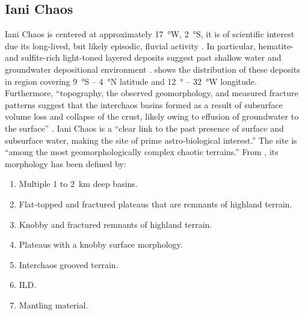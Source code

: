 \subsection{Iani Chaos}
\label{sec:MissionSites:IaniChaos}
Iani Chaos is centered at approximately \SI{17}{\degree}W, \SI{2}{\degree}S, it is of scientific interest due its long-lived, but likely episodic, fluvial activity . In particular, hematite- and sulfite-rich light-toned layered deposits suggest past shallow water and groundwater depositional environment .  shows the distribution of these deposits in region covering \SI{9}{\degree}S – \SI{4}{\degree}N latitude and \SI{12}{\degree} – \SI{32}{\degree}W longitude. Furthermore, ``topography, the observed geomorphology, and measured fracture patterns suggest that the interchaos basins formed as a result of subsurface volume loss and collapse of the crust, likely owing to effusion of groundwater to the surface'' . Iani Chaos is a ``clear link to the past presence of surface and subsurface water, making the site of prime astro-biological interest.''  The site is ``among the most geomorphologically complex chaotic terrains.'' From  , its morphology has been defined by:

\begin{enumerate}[label=\textcolor{BulletBlue}{(\alph*)}]
    \item Multiple 1 to \SI{2}{\kilo\meter} deep basins.
    \item Flat‐topped and fractured plateaus that are remnants of highland terrain.
    \item Knobby and fractured remnants of highland terrain.
    \item Plateaus with a knobby surface morphology.
    \item Interchaos grooved terrain.
    \item \ac{ILD}.
    \item Mantling material.
\end{enumerate}

